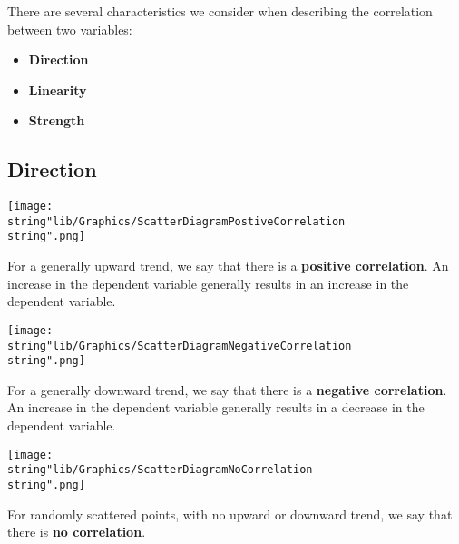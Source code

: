\documentclass[11pt,a4paper]{book}
\begin{document}
There are several characteristics we consider when describing the
correlation between two variables:

\begin{itemize}

\item  \textbf{Direction}

\item  \textbf{Linearity}

\item  \textbf{Strength}

\end{itemize}

\subsection{Direction}

\begin{minipage}{.35\textwidth}
\begin{center}
\texttt{[image: \\string"lib/Graphics/ScatterDiagramPostiveCorrelation\\string".png]}
\par\end{center}

\end{minipage}
\begin{minipage}{.6\textwidth}

For a generally upward trend, we say that there is a \textbf{positive
correlation}. An increase in the dependent variable generally results
in an increase in the dependent variable.

\end{minipage}

\begin{minipage}{.35\textwidth}
\begin{center}
\texttt{[image: \\string"lib/Graphics/ScatterDiagramNegativeCorrelation\\string".png]}
\par\end{center}

\end{minipage}
\begin{minipage}{.6\textwidth}

For a generally downward trend, we say that there is a \textbf{negative
correlation}. An increase in the dependent variable generally results
in a decrease in the dependent variable.

\end{minipage}

\begin{minipage}{.35\textwidth}
\begin{center}
\texttt{[image: \\string"lib/Graphics/ScatterDiagramNoCorrelation\\string".png]}
\par\end{center}

\end{minipage}
\begin{minipage}{.6\textwidth}

For randomly scattered points, with no upward or downward trend, we
say that there is \textbf{no correlation}.

\end{minipage}
\end{document}
